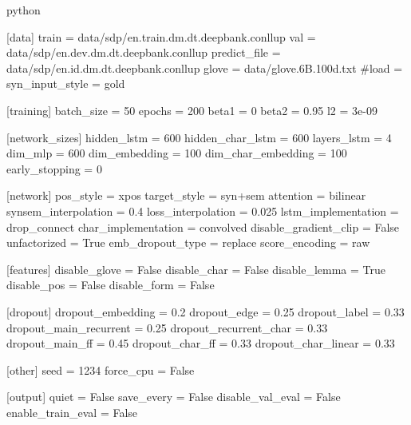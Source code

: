 \documentclass[11pt]{scrartcl}
\begin{document}
\begin{mintedbox}{python}

[data]
train                  = data/sdp/en.train.dm.dt.deepbank.conllup
val                    = data/sdp/en.dev.dm.dt.deepbank.conllup
predict_file           = data/sdp/en.id.dm.dt.deepbank.conllup
glove                  = data/glove.6B.100d.txt
#load                   = 
syn_input_style        = gold

[training]
batch_size             = 50
epochs                 = 200
beta1                  = 0
beta2                  = 0.95
l2                     = 3e-09

[network_sizes]
hidden_lstm            = 600
hidden_char_lstm       = 600
layers_lstm            = 4
dim_mlp                = 600
dim_embedding          = 100
dim_char_embedding     = 100
early_stopping         = 0

[network]
pos_style              = xpos
target_style           = syn+sem 
attention              = bilinear
synsem_interpolation   = 0.4
loss_interpolation     = 0.025
lstm_implementation    = drop_connect
char_implementation    = convolved
disable_gradient_clip  = False
unfactorized           = True
emb_dropout_type       = replace
score_encoding         = raw

[features]
disable_glove          = False
disable_char           = False
disable_lemma          = True
disable_pos            = False
disable_form           = False

[dropout]
dropout_embedding      = 0.2
dropout_edge           = 0.25
dropout_label          = 0.33
dropout_main_recurrent = 0.25
dropout_recurrent_char = 0.33
dropout_main_ff        = 0.45
dropout_char_ff        = 0.33
dropout_char_linear    = 0.33

[other]
seed                   = 1234
force_cpu              = False

[output]
quiet                  = False
save_every             = False
disable_val_eval       = False
enable_train_eval      = False


\end{mintedbox}
\end{document}

